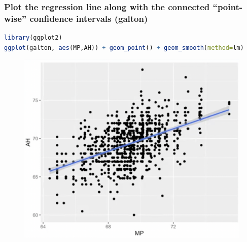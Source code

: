 \documentclass[11pt,a4paper]{article}
\begin{document}
\subsubsection{Plot the regression line along with the connected “point-wise” confidence intervals (galton)}
\begin{lstlisting}[language=R]
library(ggplot2)
ggplot(galton, aes(MP,AH)) + geom_point() + geom_smooth(method=lm)
\end{lstlisting}
\begin{center}\begin{figure}[htbp]
    \centering
    \includegraphics[scale=0.5]{plot1.png}
    \caption{}
    \label{}
\end{figure}\end{center}
\end{document}
